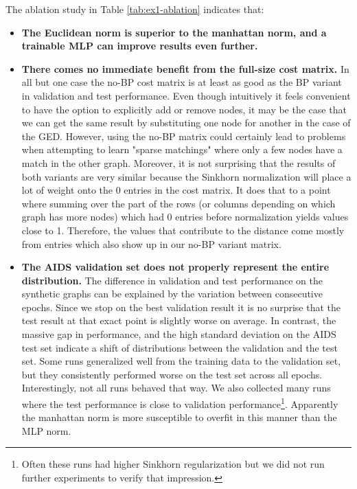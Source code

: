 The ablation study in Table \ref{tab:ex1-ablation} indicates that:
\begin{itemize}
    \itemsep0em
    \item \textbf{The Euclidean norm is superior to the manhattan norm, and a trainable MLP can improve results even further.}
    \item \textbf{There comes no immediate benefit from the full-size cost matrix.} In all but one case the no-BP cost matrix is at least as good as the BP variant in validation and test performance. Even though intuitively it feels convenient to have the option to explicitly add or remove nodes, it may be the case that we can get the same result by substituting one node for another in the case of the GED. However, using the no-BP matrix could certainly lead to problems when attempting to learn "sparse matchings" where only a few nodes have a match in the other graph. Moreover, it is not surprising that the results of both variants are very similar because the Sinkhorn normalization will place a lot of weight onto the 0 entries in the cost matrix. It does that to a point where summing over the part of the rows (or columns depending on which graph has more nodes) which had 0 entries before normalization yields values close to 1. Therefore, the values that contribute to the distance come mostly from entries which also show up in our no-BP variant matrix.
    \item \textbf{The AIDS validation set does not properly represent the entire distribution.} The difference in validation and test performance on the synthetic graphs can be explained by the variation between consecutive epochs. Since we stop on the best validation result it is no surprise that the test result at that exact point is slightly worse on average. In contrast, the massive gap in performance, and the high standard deviation on the AIDS test set indicate a shift of distributions between the validation and the test set. Some runs generalized well from the training data to the validation set, but they consistently performed worse on the test set across all epochs. Interestingly, not all runs behaved that way. We also collected many runs where the test performance is close to validation performance\footnote{Often these runs had higher Sinkhorn regularization but we did not run further experiments to verify that impression.}. Apparently the manhattan norm is more susceptible to overfit in this manner than the MLP norm.
\end{itemize}


